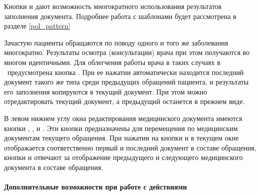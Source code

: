 Кнопки   и   дают возможность многократного использования результатов заполнения документа. Подробнее работа с шаблонами будет рассмотрена в разделе \ref{pol_pattern}

\begin{prim}
 Зачастую пациенты обращаются по поводу одного и того же заболевания многократно. Результаты осмотра (консультации) врача при этом получаются во многом идентичными. Для облегчения работы врача в таких случаях в \tmis~предусмотрена кнопка . При ее нажатии автоматически находится последний документ такого же типа среди предыдущих обращений пациента, и результаты его заполнения копируются в текущий документ. При этом можно отредактировать текущий документ, а предыдущий останется в прежнем виде.
\end{prim}

В левом нижнем углу окна редактирования медицинского документа имеются кнопки  \btn{$\gg$}, \btn{$\ll$}, \btn{>\rule{1pt}{8pt}}  и \btn{\rule{1pt}{8pt}<}. Эти кнопки предназначены для перемещения по медицинским документам текущего обращения. При нажатии на кнопки  \btn{>\rule{1pt}{8pt}}  и \btn{\rule{1pt}{8pt}<}   в текущем окне отображается соответственно первый и последний документ в составе обращения, кнопки  \btn{$\gg$} и \btn{$\ll$} отвечают за отображение предыдущего и следующего медицинского документа в составе обращения.

\paragraph{Дополнительные возможности при работе с действиями}

